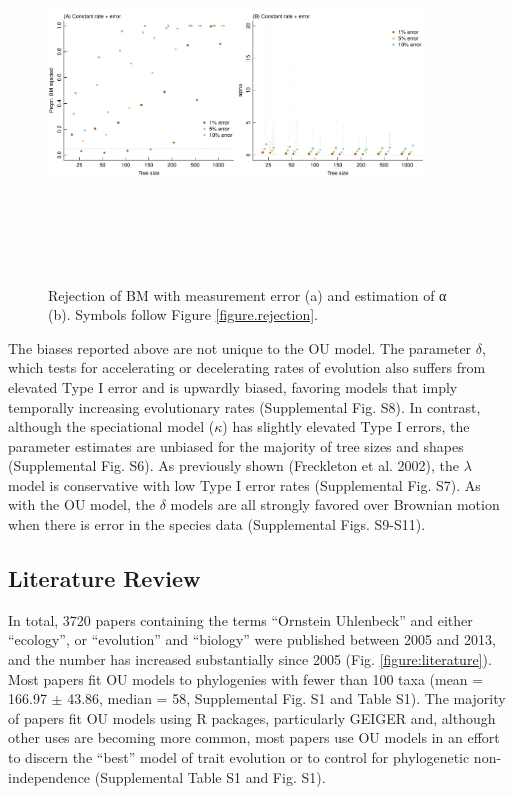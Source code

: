 \documentclass[a4paper,12pt]{article}
\begin{document}
\begin{figure}
  \centering
  \includegraphics[width=10cm, height=10cm, keepaspectratio=true]{Figures/OU_figure5.pdf}
  \caption{Rejection of BM with measurement error (a) and estimation of α (b). Symbols follow Figure \ref{figure.rejection}.}
\label{figure.error}
\end{figure}

The biases reported above are not unique to the OU model. The parameter $\delta$, which tests for accelerating or decelerating rates of evolution \citep{Pagel:1997aa,Pagel:1999aa} also suffers from elevated Type I error and is upwardly biased, favoring models that imply temporally increasing evolutionary rates (Supplemental Fig. S8). In contrast, although the speciational model ($\kappa$) has slightly elevated Type I errors, the parameter estimates are unbiased for the majority of tree sizes and shapes (Supplemental Fig. S6). As previously shown (Freckleton et al. 2002), the $\lambda$ model is conservative with low Type I error rates (Supplemental Fig. S7). As with the OU model, the $\delta$ models are all strongly favored over Brownian motion when there is error in the species data (Supplemental Figs. S9-S11). 

\subsection{Literature Review}
\label{section:literature.results}
In total, 3720 papers containing the terms “Ornstein Uhlenbeck” and either “ecology”, or “evolution” and “biology” were published between 2005 and 2013, and the number has increased substantially since 2005 (Fig. \ref{figure:literature}). Most papers fit OU models to phylogenies with fewer than 100 taxa (mean = 166.97 $\pm$ 43.86, median = 58, Supplemental Fig. S1 and Table S1). The majority of papers fit OU models using R packages, particularly GEIGER and, although other uses are becoming more common, most papers use OU models in an effort to discern the “best” model of trait evolution or to control for phylogenetic non-independence (Supplemental Table S1 and Fig. S1). 
 
\end{document}
